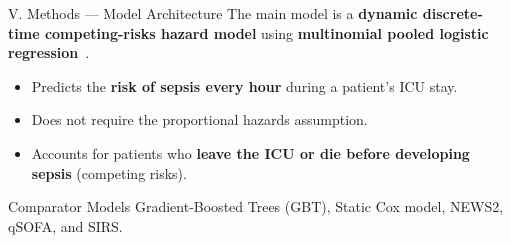 \documentclass[aspectratio=169,10pt]{beamer}
\begin{document}
\begin{frame}{V. Methods --- Model Architecture}
The main model is a \textbf{dynamic discrete-time competing-risks hazard model} using \textbf{multinomial pooled logistic regression}~\cite{dagostino1990pooled}.

\vspace{6pt}
\begin{itemize}
  \item Predicts the \textbf{risk of sepsis every hour} during a patient's ICU stay.
  \item Does not require the proportional hazards assumption.
  \item Accounts for patients who \textbf{leave the ICU or die before developing sepsis} (competing risks).
\end{itemize}

\vspace{8pt}
\begin{exampleblock}{Comparator Models}
Gradient-Boosted Trees (GBT), Static Cox model, NEWS2, qSOFA, and SIRS.
\end{exampleblock}
\end{frame}
\end{document}
